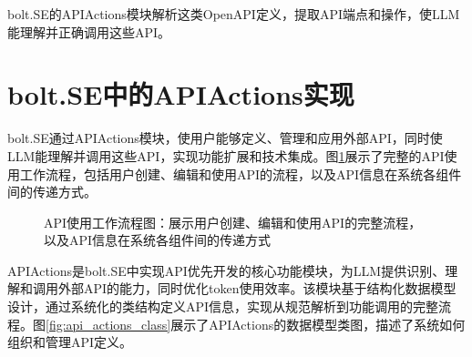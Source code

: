 bolt.SE的APIActions模块解析这类OpenAPI定义，提取API端点和操作，使LLM能理解并正确调用这些API。

\section{bolt.SE中的APIActions实现}
bolt.SE通过APIActions模块，使用户能够定义、管理和应用外部API，同时使LLM能理解并调用这些API，实现功能扩展和技术集成。图\ref{fig:api_workflow}展示了完整的API使用工作流程，包括用户创建、编辑和使用API的流程，以及API信息在系统各组件间的传递方式。

\begin{figure}[H]
  \caption{API使用工作流程图：展示用户创建、编辑和使用API的完整流程，以及API信息在系统各组件间的传递方式}
  \label{fig:api_workflow}
\end{figure}

APIActions是bolt.SE中实现API优先开发的核心功能模块，为LLM提供识别、理解和调用外部API的能力，同时优化token使用效率。该模块基于结构化数据模型设计，通过系统化的类结构定义API信息，实现从规范解析到功能调用的完整流程。图\ref{fig:api_actions_class}展示了APIActions的数据模型类图，描述了系统如何组织和管理API定义。

